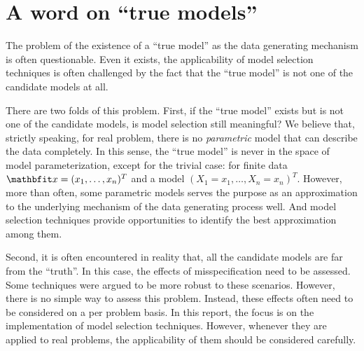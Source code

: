 \section{A word on ``true models''}
\label{sec:A word on true models}

The problem of the existence of a ``true model'' as the data generating
mechanism is often questionable. Even it exists, the applicability of model
selection techniques is often challenged by the fact that the ``true model''
is not one of the candidate models at all.

There are two folds of this problem. First, if the ``true model'' exists but
is not one of the candidate models, is model selection still meaningful? We
believe that, strictly speaking, for real problem, there is no
\emph{parametric} model that can describe the data completely. In this sense,
the ``true model'' is never in the space of model parameterization, except for
the trivial case: for finite data $\bfx = (x_1,\dots,x_n)^T$ and a model $(X_1
= x_1,\dots,X_n = x_n)^T$. However, more than often, some parametric models
serves the purpose as an approximation to the underlying mechanism of the data
generating process well. And model selection techniques provide opportunities
to identify the best approximation among them.

Second, it is often encountered in reality that, all the candidate models are
far from the ``truth''. In this case, the effects of misspecification need to
be assessed. Some techniques were argued to be more robust to these scenarios.
However, there is no simple way to assess this problem. Instead, these effects
often need to be considered on a per problem basis. In this report, the focus
is on the implementation of model selection techniques. However, whenever they
are applied to real problems, the applicability of them should be considered
carefully.
